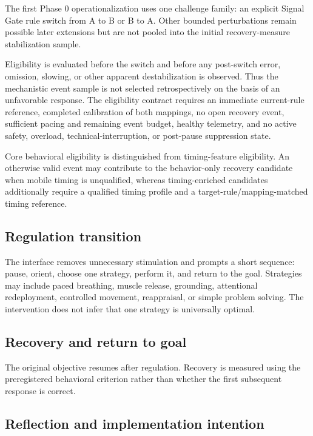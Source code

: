 The first Phase 0 operationalization uses one challenge family: an explicit Signal Gate rule switch from A to B or B to A. Other bounded perturbations remain possible later extensions but are not pooled into the initial recovery-measure stabilization sample.

Eligibility is evaluated before the switch and before any post-switch error, omission, slowing, or other apparent destabilization is observed. Thus the mechanistic event sample is not selected retrospectively on the basis of an unfavorable response. The eligibility contract requires an immediate current-rule reference, completed calibration of both mappings, no open recovery event, sufficient pacing and remaining event budget, healthy telemetry, and no active safety, overload, technical-interruption, or post-pause suppression state.

Core behavioral eligibility is distinguished from timing-feature eligibility. An otherwise valid event may contribute to the behavior-only recovery candidate when mobile timing is unqualified, whereas timing-enriched candidates additionally require a qualified timing profile and a target-rule/mapping-matched timing reference.

\subsection{Regulation transition}

The interface removes unnecessary stimulation and prompts a short sequence: pause, orient, choose one strategy, perform it, and return to the goal. Strategies may include paced breathing, muscle release, grounding, attentional redeployment, controlled movement, reappraisal, or simple problem solving. The intervention does not infer that one strategy is universally optimal.

\subsection{Recovery and return to goal}

The original objective resumes after regulation. Recovery is measured using the preregistered behavioral criterion rather than whether the first subsequent response is correct.

\subsection{Reflection and implementation intention}


